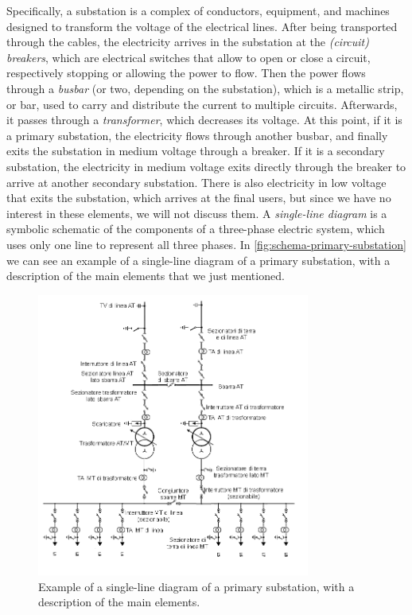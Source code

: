 Specifically, a substation is a complex of conductors, equipment, and machines designed to transform the voltage of the electrical lines. After being transported through the cables, the electricity arrives in the substation at the \emph{(circuit) breakers}, which are electrical switches that allow to open or close a circuit, respectively stopping or allowing the power to flow. Then the power flows through a \emph{busbar} (or two, depending on the substation), which is a metallic strip, or bar, used to carry and distribute the current to multiple circuits. Afterwards, it passes through a \emph{transformer}, which decreases its voltage. At this point, if it is a primary substation, the electricity flows through another busbar, and finally exits the substation in medium voltage through a breaker. If it is a secondary substation, the electricity in medium voltage exits directly through the breaker to arrive at another secondary substation. There is also electricity in low voltage that exits the substation, which arrives at the final users, but since we have no interest in these elements, we will not discuss them. A \emph{single-line diagram} is a symbolic schematic of the components of a three-phase electric system, which uses only one line to represent all three phases. In \autoref{fig:schema-primary-substation} we can see an example of a single-line diagram of a primary substation, with a description of the main elements that we just mentioned.

\begin{figure}[t]
    \centering
    \includegraphics[width=0.8\textwidth]{chapters/figures/Schema_Unifilare_Cabina_Primaria.png}
    \caption{Example of a single-line diagram of a primary substation, with a description of the main elements.}
    \label{fig:schema-primary-substation}
\end{figure}

